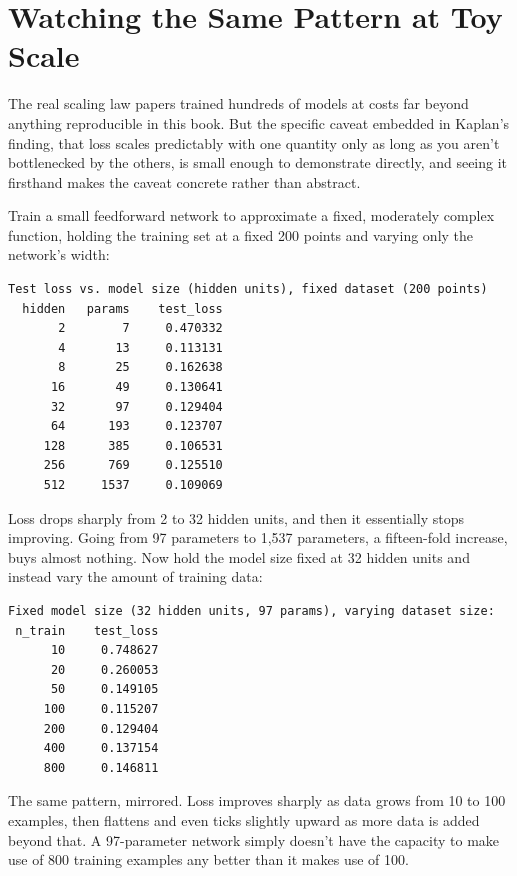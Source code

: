 \section*{Watching the Same Pattern at Toy Scale}

The real scaling law papers trained hundreds of models at costs far beyond anything reproducible in this book. But the specific caveat embedded in Kaplan's finding, that loss scales predictably with one quantity only as long as you aren't bottlenecked by the others, is small enough to demonstrate directly, and seeing it firsthand makes the caveat concrete rather than abstract.

Train a small feedforward network to approximate a fixed, moderately complex function, holding the training set at a fixed 200 points and varying only the network's width:

\begin{Verbatim}[fontsize=\small, frame=single, xleftmargin=1em, xrightmargin=1em]
Test loss vs. model size (hidden units), fixed dataset (200 points)
  hidden   params    test_loss
       2        7     0.470332
       4       13     0.113131
       8       25     0.162638
      16       49     0.130641
      32       97     0.129404
      64      193     0.123707
     128      385     0.106531
     256      769     0.125510
     512     1537     0.109069
\end{Verbatim}

Loss drops sharply from 2 to 32 hidden units, and then it essentially stops improving. Going from 97 parameters to 1,537 parameters, a fifteen-fold increase, buys almost nothing. Now hold the model size fixed at 32 hidden units and instead vary the amount of training data:

\begin{Verbatim}[fontsize=\small, frame=single, xleftmargin=1em, xrightmargin=1em]
Fixed model size (32 hidden units, 97 params), varying dataset size:
 n_train    test_loss
      10     0.748627
      20     0.260053
      50     0.149105
     100     0.115207
     200     0.129404
     400     0.137154
     800     0.146811
\end{Verbatim}

The same pattern, mirrored. Loss improves sharply as data grows from 10 to 100 examples, then flattens and even ticks slightly upward as more data is added beyond that. A 97-parameter network simply doesn't have the capacity to make use of 800 training examples any better than it makes use of 100.

